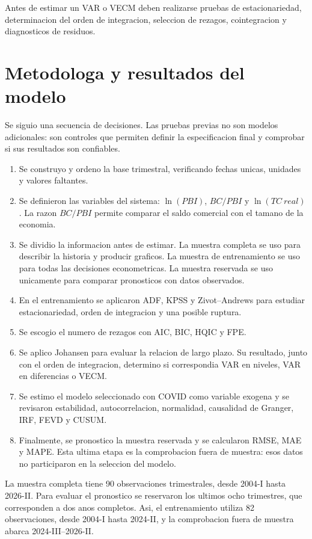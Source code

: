 \documentclass[12pt,a4paper]{article}
\begin{document}
Antes de estimar un VAR o VECM deben realizarse pruebas de estacionariedad,
determinacion del orden de integracion, seleccion de rezagos, cointegracion y
diagnosticos de residuos.

\section{Metodologa y resultados del modelo}

Se siguio una secuencia de decisiones. Las pruebas previas no son modelos
adicionales: son controles que permiten definir la especificacion final y
comprobar si sus resultados son confiables.

\begin{enumerate}[leftmargin=*]
  \item Se construyo y ordeno la base trimestral, verificando fechas unicas,
  unidades y valores faltantes.
  \item Se definieron las variables del sistema: $\ln(PBI)$, $BC/PBI$ y
  $\ln(TC\ real)$. La razon $BC/PBI$ permite comparar el saldo comercial con el
  tamano de la economia.
  \item Se dividio la informacion antes de estimar. La muestra completa se
  uso para describir la historia y producir graficos. La muestra de
  entrenamiento se uso para todas las decisiones econometricas. La muestra
  reservada se uso unicamente para comparar pronosticos con datos observados.
  \item En el entrenamiento se aplicaron ADF, KPSS y Zivot--Andrews para
  estudiar estacionariedad, orden de integracion y una posible ruptura.
  \item Se escogio el numero de rezagos con AIC, BIC, HQIC y FPE.
  \item Se aplico Johansen para evaluar la relacion de largo plazo. Su
  resultado, junto con el orden de integracion, determino si correspondia VAR
  en niveles, VAR en diferencias o VECM.
  \item Se estimo el modelo seleccionado con COVID como variable exogena y se
  revisaron estabilidad, autocorrelacion, normalidad, causalidad de Granger,
  IRF, FEVD y CUSUM.
  \item Finalmente, se pronostico la muestra reservada y se calcularon RMSE,
  MAE y MAPE. Esta ultima etapa es la comprobacion fuera de muestra: esos
  datos no participaron en la seleccion del modelo.
\end{enumerate}

La muestra completa tiene 90 observaciones trimestrales, desde 2004-I hasta
2026-II. Para evaluar el pronostico se reservaron los ultimos ocho trimestres,
que corresponden a dos anos completos. Asi, el entrenamiento utiliza 82
observaciones, desde 2004-I hasta 2024-II, y la comprobacion fuera de muestra
abarca 2024-III--2026-II.
\end{document}
